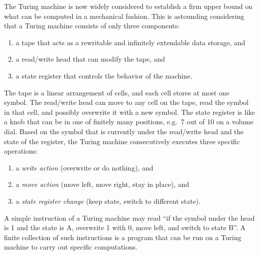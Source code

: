 The Turing machine is now widely considered to establish a firm upper bound on what can be computed in a mechanical fashion.
This is astounding considering that a Turing machine consists of only three components:
%
\begin{enumerate}
    \item a tape that acts as a rewritable and infinitely extendable data storage, and
    \item a read/write head that can modify the tape, and
    \item a state register that controls the behavior of the machine.
\end{enumerate}
%
The tape is a linear arrangement of cells, and each cell stores at most one symbol.
The read/write head can move to any cell on the tape, read the symbol in that cell, and possibly overwrite it with a new symbol.
The state register is like a knob that can be in one of finitely many positions, e.g.\ 7 out of 10 on a volume dial.
Based on the symbol that is currently under the read/write head and the state of the register, the Turing machine consecutively executes three specific operations: 
%
\begin{enumerate}
    \item a \emph{write action} (overwrite or do nothing), and
    \item a \emph{move action} (move left, move right, stay in place), and
    \item a \emph{state register change} (keep state, switch to different state).
\end{enumerate}
%
A simple instruction of a Turing machine may read ``if the symbol under the head is 1 and the state is A, overwrite 1 with 0, move left, and switch to state B''.
A finite collection of such instructions is a program that can be run on a Turing machine to carry out specific computations.

